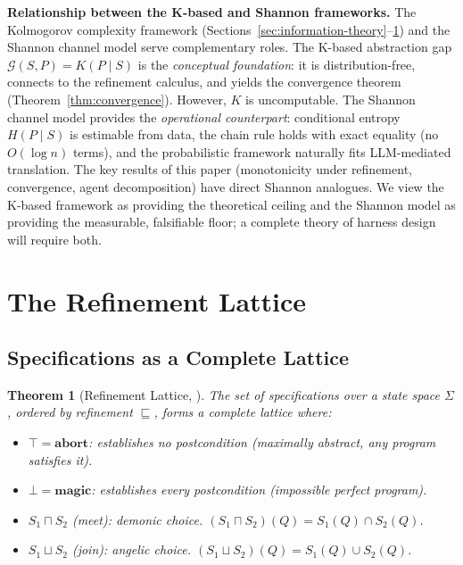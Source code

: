\documentclass[11pt, a4paper, copyright]{googledeepmind}
\newtheorem{theorem}{Theorem}[section]
\begin{document}
\textbf{Relationship between the K-based and Shannon frameworks.} The Kolmogorov complexity framework (Sections~\ref{sec:information-theory}--\ref{sec:refinement-lattice}) and the Shannon channel model serve complementary roles. The K-based abstraction gap $\mathcal{G}(S, P) = K(P \mid S)$ is the \emph{conceptual foundation}: it is distribution-free, connects to the refinement calculus, and yields the convergence theorem (Theorem~\ref{thm:convergence}). However, $K$ is uncomputable. The Shannon channel model provides the \emph{operational counterpart}: conditional entropy $H(P \mid S)$ is estimable from data, the chain rule holds with exact equality (no $O(\log n)$ terms), and the probabilistic framework naturally fits LLM-mediated translation. The key results of this paper (monotonicity under refinement, convergence, agent decomposition) have direct Shannon analogues. We view the K-based framework as providing the theoretical ceiling and the Shannon model as providing the measurable, falsifiable floor; a complete theory of harness design will require both.


\section{The Refinement Lattice}
\label{sec:refinement-lattice}

\subsection{Specifications as a Complete Lattice}

\begin{theorem}[Refinement Lattice, \citealp{back1980correctness, morgan1994programming}]
\label{thm:lattice}
The set of specifications over a state space $\Sigma$, ordered by refinement $\sqsubseteq$, forms a \emph{complete lattice} where:
\begin{itemize}
    \item $\top = \textbf{abort}$: establishes no postcondition (maximally abstract, any program satisfies it).
    \item $\bot = \textbf{magic}$: establishes every postcondition (impossible perfect program).
    \item $S_1 \sqcap S_2$ (meet): demonic choice. $(S_1 \sqcap S_2)(Q) = S_1(Q) \cap S_2(Q)$.
    \item $S_1 \sqcup S_2$ (join): angelic choice. $(S_1 \sqcup S_2)(Q) = S_1(Q) \cup S_2(Q)$.
\end{itemize}
\end{theorem}
\end{document}
